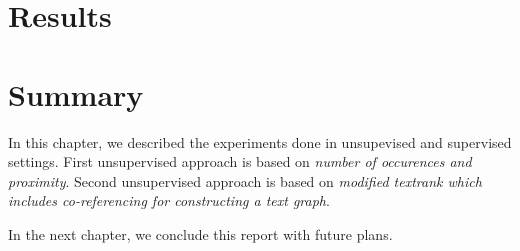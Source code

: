 \section{Results}

\section{Summary}
In this chapter, we described the experiments done in unsupevised and supervised settings. First unsupervised approach is based on \textit{number of occurences and proximity}. Second unsupervised approach is based on \textit{ modified textrank which includes co-referencing for constructing a text graph}. 


In the next chapter,  we conclude this report with future plans.